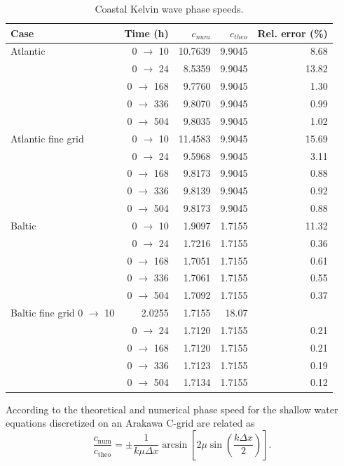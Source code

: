 \begin{table}[ht]
\centering
\begin{tabular}{lrrrr}
\hline
Case & Time (h) & $c_{num}$ & $c_{theo}$ & Rel. error (\%) \\
\hline
Atlantic & 0 $\rightarrow$ 10 & 10.7639 & 9.9045 & 8.68 \\
 & 0 $\rightarrow$ 24 & 8.5359 & 9.9045 & 13.82 \\
 & 0 $\rightarrow$ 168 & 9.7760 & 9.9045 & 1.30 \\
 & 0 $\rightarrow$ 336 & 9.8070 & 9.9045 & 0.99 \\
 & 0 $\rightarrow$ 504 & 9.8035 & 9.9045 & 1.02 \\
\hline
Atlantic fine grid & 0 $\rightarrow$ 10 & 11.4583 & 9.9045 & 15.69 \\
 & 0 $\rightarrow$ 24 & 9.5968 & 9.9045 & 3.11 \\
 & 0 $\rightarrow$ 168 & 9.8173 & 9.9045 & 0.88 \\
 & 0 $\rightarrow$ 336 & 9.8139 & 9.9045 & 0.92 \\
 & 0 $\rightarrow$ 504 & 9.8173 & 9.9045 & 0.88 \\
\hline
Baltic & 0 $\rightarrow$ 10 & 1.9097 & 1.7155 & 11.32 \\
 & 0 $\rightarrow$ 24 & 1.7216 & 1.7155 & 0.36 \\
 & 0 $\rightarrow$ 168 & 1.7051 & 1.7155 & 0.61 \\
 & 0 $\rightarrow$ 336 & 1.7061 & 1.7155 & 0.55 \\
 & 0 $\rightarrow$ 504 & 1.7092 & 1.7155 & 0.37 \\
\hline
Baltic fine grid 0 $\rightarrow$ 10 & 2.0255 & 1.7155 & 18.07 \\
 & 0 $\rightarrow$ 24 & 1.7120 & 1.7155 & 0.21 \\
 & 0 $\rightarrow$ 168 & 1.7120 & 1.7155 & 0.21 \\
 & 0 $\rightarrow$ 336 & 1.7123 & 1.7155 & 0.19 \\
 & 0 $\rightarrow$ 504 & 1.7134 & 1.7155 & 0.12 \\
\hline
\end{tabular}
\caption{Coastal Kelvin wave phase speeds.}
\label{tab:coast}
\end{table}
\newpage
According to \citet{Doos2022} the theoretical and numerical phase speed for the shallow water equations discretized on an Arakawa C-grid are related as 
\begin{equation}
    \frac{c_\text{num}}{c_\text{theo}}=\pm\frac{1}{k\mu\Delta x}\arcsin\left[2\mu\sin\left(\frac{k\Delta x}{2}\right)\right].
    \label{eq:phase}
\end{equation}
